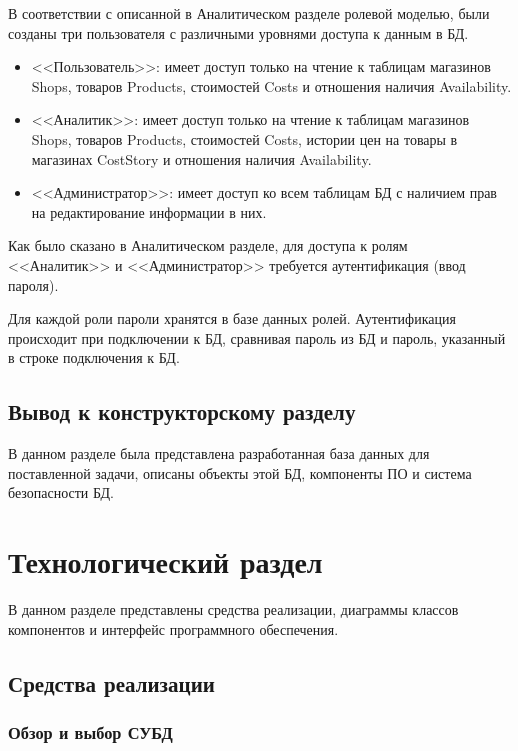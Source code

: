 \documentclass{bmstu}
\begin{document}
В соответствии с описанной в Аналитическом разделе ролевой моделью, были созданы три пользователя с различными уровнями доступа к данным в БД.

\begin{itemize}
	\item <<Пользователь>>: имеет доступ только на чтение к таблицам магазинов Shops, товаров Products, стоимостей Costs и отношения наличия Availability.
	\item <<Аналитик>>: имеет доступ только на чтение к таблицам магазинов Shops, товаров Products, стоимостей Costs, истории цен на товары в магазинах CostStory и отношения наличия Availability.
	\item <<Администратор>>: имеет доступ ко всем таблицам БД с наличием прав на редактирование информации в них.
\end{itemize}

Как было сказано в Аналитическом разделе, для доступа к ролям <<Аналитик>> и <<Администратор>> требуется аутентификация (ввод пароля).

Для каждой роли пароли хранятся в базе данных ролей. Аутентификация происходит при подключении к БД, сравнивая пароль из БД и пароль, указанный в строке подключения к БД.

\section*{Вывод к конструкторскому разделу}

В данном разделе была представлена разработанная база данных для поставленной задачи, описаны объекты этой БД, компоненты ПО и система безопасности БД.

\chapter{Технологический раздел}

В данном разделе представлены средства реализации, диаграммы классов компонентов и интерфейс программного обеспечения.

\section{Средства реализации}

\subsection*{Обзор и выбор СУБД}
\end{document}
